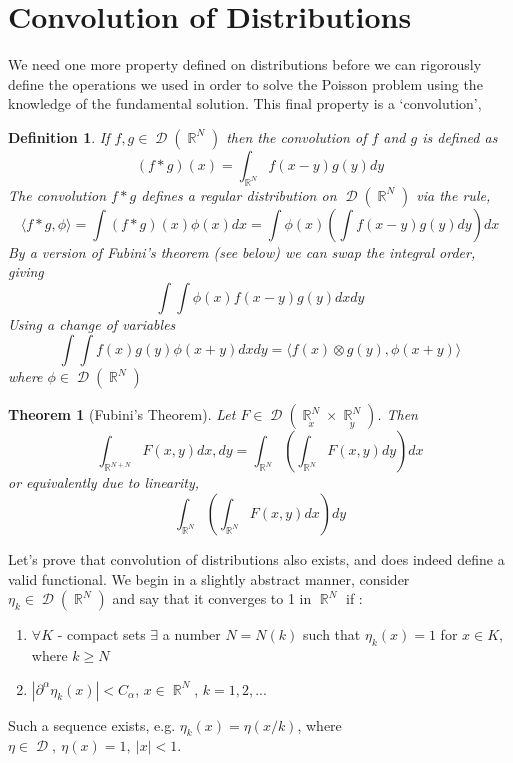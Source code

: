 \documentclass[12pt, a4]{article}
\newtheorem{theorem}{Theorem}[section]
\newtheorem{definition}{Definition}[section]
\DeclareMathOperator\reals{\mathbb{R}}
\DeclareMathOperator\tfspaceD{\mathcal{D}}
\begin{document}
\section{Convolution of Distributions}

We need one more property defined on distributions before we can rigorously define the operations we used in order to solve the Poisson problem using the knowledge of the fundamental solution. This final property is a `convolution',

\begin{definition}
If $f, g \in \tfspaceD(\reals^N)$ then the convolution of $f$ and $g$ is defined as \[ (f*g) (x) = \int_{\reals^N} f(x-y) g(y) dy \] The convolution $f*g$ defines a regular distribution on $\tfspaceD(\reals^N)$ via the rule,
\[ \langle f * g, \phi \rangle = \int (f * g) (x) \phi(x) dx =  \int \phi(x) \left(\int f(x-y) g(y) dy\right) dx\]
By a version of Fubini's theorem (see below) we can swap the integral order, giving \[ \int \int \phi(x) f(x-y) g(y) dx dy\] Using a change of variables \[ \int \int f(x) g(y) \phi(x+y) dx dy = \langle f(x) \otimes g(y), \phi(x+y) \rangle \] where $\phi \in \tfspaceD(\reals^N)$
\end{definition}

\begin{theorem}[Fubini's Theorem]
    Let $F \in \tfspaceD(\underset{x}{\reals^N} \times \underset{y}{\reals^N})$.
    Then \[ \int_{\reals^{N+N}} F(x, y) dx, dy  = \int_{\reals^N} \left(\int_{\reals^N} F(x, y) dy\right) dx\] or equivalently due to linearity,
    \[ \int_{\reals^N} \left(\int_{\reals^N} F(x, y) dx\right) dy\]

\end{theorem}

Let's prove that convolution of distributions also exists, and does indeed define a valid functional. We begin in a slightly abstract manner, consider $\eta_k \in \tfspaceD(\reals^N)$ and say that it converges to 1 in $\reals^N$ if :

\begin{enumerate}
    \item $\forall K$ - compact sets $\exists$ a number $N=N(k)$ such that $\eta_k(x) = 1$ for $x \in K$, where $k \geq N$
    \item $|\partial^{\alpha}\eta_k(x)| < C_\alpha$, $x \in \reals^N$, $k = 1, 2, ...$
\end{enumerate}


Such a sequence exists, e.g. $\eta_k(x) = \eta(x/k)$, where $\eta \in \tfspaceD, \> \eta(x) = 1, \> |x| < 1$.
\end{document}
